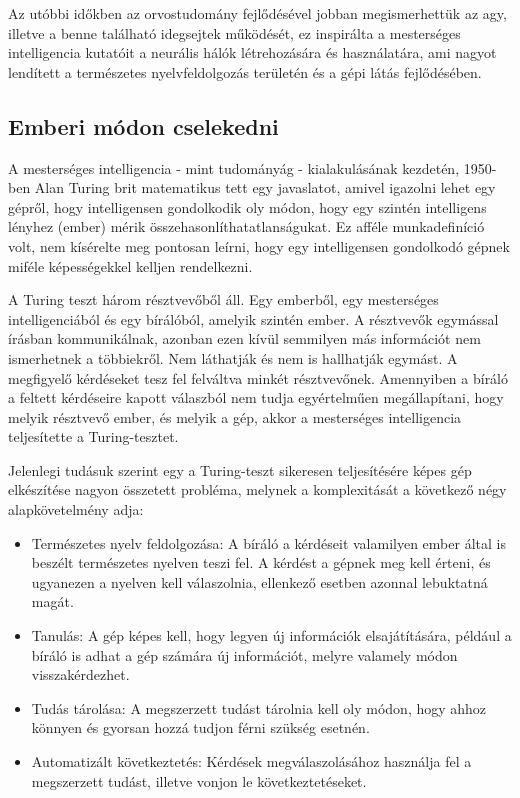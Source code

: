 Az utóbbi időkben az orvostudomány fejlődésével jobban megismerhettük az agy, illetve a benne található idegsejtek működését, ez inspirálta a mesterséges intelligencia kutatóit a neurális hálók létrehozására és használatára, ami nagyot lendített a természetes nyelvfeldolgozás területén és a gépi látás fejlődésében.

\subsection{Emberi módon cselekedni}
A mesterséges intelligencia - mint tudományág - kialakulásának kezdetén, 1950-ben Alan Turing brit matematikus tett egy javaslatot, amivel igazolni lehet egy gépről, hogy intelligensen gondolkodik oly módon, hogy egy szintén intelligens lényhez (ember) mérik összehasonlíthatatlanságukat. Ez afféle munkadefiníció volt, nem kísérelte meg pontosan leírni, hogy egy intelligensen gondolkodó gépnek miféle képességekkel kelljen rendelkezni.\ujsor

A Turing teszt három résztvevőből áll. Egy emberből, egy mesterséges intelligenciából és egy bírálóból, amelyik szintén ember. A résztvevők egymással írásban kommunikálnak, azonban ezen kívül semmilyen más információt nem ismerhetnek a többiekről. Nem láthatják és nem is hallhatják egymást. A megfigyelő kérdéseket tesz fel felváltva minkét résztvevőnek. Amennyiben a bíráló a feltett kérdéseire kapott válaszból nem tudja egyértelműen megállapítani, hogy melyik résztvevő ember, és melyik a gép, akkor a mesterséges intelligencia teljesítette a Turing-tesztet.\ujsor

Jelenlegi tudásuk szerint egy a Turing-teszt sikeresen teljesítésére képes gép elkészítése nagyon összetett probléma, melynek a komplexitását a következő négy alapkövetelmény adja:
\begin{itemize}
	\item Természetes nyelv feldolgozása: A bíráló a kérdéseit valamilyen ember által is beszélt természetes nyelven teszi fel. A kérdést a gépnek meg kell érteni, és ugyanezen a nyelven kell válaszolnia, ellenkező esetben azonnal lebuktatná magát.
	\item Tanulás: A gép képes kell, hogy legyen új információk elsajátítására, például a bíráló is adhat a gép számára új információt, melyre valamely módon visszakérdezhet.
	\item Tudás tárolása: A megszerzett tudást tárolnia kell oly módon, hogy ahhoz\\ könnyen és gyorsan hozzá tudjon férni szükség esetnén.
	\item Automatizált következtetés: Kérdések megválaszolásához használja fel a megszerzett tudást, illetve vonjon le következtetéseket.
\end{itemize}

